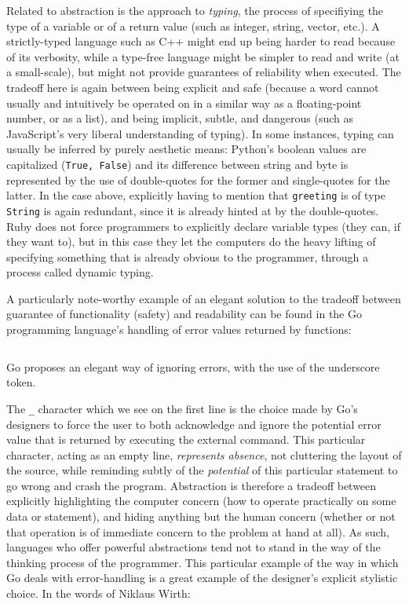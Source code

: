 Related to abstraction is the approach to \emph{typing}, the process of specifiying the type of a variable or of a return value (such as integer, string, vector, etc.). A strictly-typed language such as C++ might end up being harder to read because of its verbosity, while a type-free language might be simpler to read and write (at a small-scale), but might not provide guarantees of reliability when executed. The tradeoff here is again between being explicit and safe (because a word cannot usually and intuitively be operated on in a similar way as a floating-point number, or as a list), and being implicit, subtle, and dangerous (such as JavaScript's very liberal understanding of typing). In some instances, typing can usually be inferred by purely aesthetic means: Python's boolean values are capitalized (\lstinline{True, False}) and its difference between string and byte is represented by the use of double-quotes for the former and single-quotes for the latter. In the case above, explicitly having to mention that \lstinline{greeting} is of type \lstinline{String} is again redundant, since it is already hinted at by the double-quotes. Ruby does not force programmers to explicitly declare variable types (they can, if they want to), but in this case they let the computers do the heavy lifting of specifying something that is already obvious to the programmer, through a process called dynamic typing.

A particularly note-worthy example of an elegant solution to the tradeoff between guarantee of functionality (safety) and readability can be found in the Go programming language's handling of error values returned by functions:

\begin{listing}
  \inputminted{go}{./corpus/error_handling.go}
  \caption{Go proposes an elegant way of ignoring errors, with the use of the underscore token.}
  \label{code:error-handling}
\end{listing}

The \lstinline{_} character which we see on the first line is the choice made by Go's designers to force the user to both acknowledge and ignore the potential error value that is returned by executing the external command. This particular character, acting as an empty line, \emph{represents absence}, not cluttering the layout of the source, while reminding subtly of the \emph{potential} of this particular statement to go wrong and crash the program. Abstraction is therefore a tradeoff between explicitly highlighting the computer concern (how to operate practically on some data or statement), and hiding anything but the human concern (whether or not that operation is of immediate concern to the problem at hand at all). As such, languages who offer powerful abstractions tend not to stand in the way of the thinking process of the programmer. This particular example of the way in which Go deals with error-handling is a great example of the designer's explicit stylistic choice. In the words of Niklaus Wirth:

